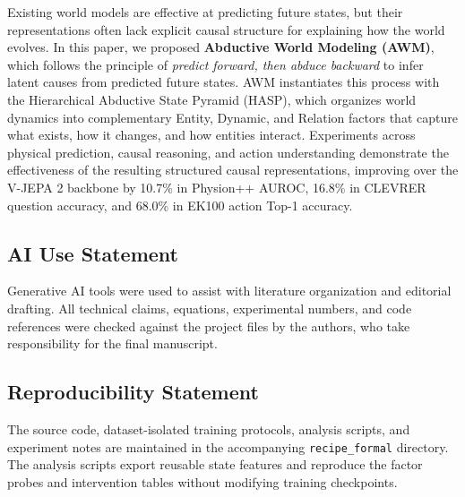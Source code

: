 \documentclass{article}
\begin{document}
Existing world models are effective at predicting future states, but their representations often lack explicit causal structure for explaining how the world evolves. In this paper, we proposed \textbf{Abductive World Modeling (AWM)}, which follows the principle of \emph{predict forward, then abduce backward} to infer latent causes from predicted future states. AWM instantiates this process with the Hierarchical Abductive State Pyramid (HASP), which organizes world dynamics into complementary Entity, Dynamic, and Relation factors that capture what exists, how it changes, and how entities interact. Experiments across physical prediction, causal reasoning, and action understanding demonstrate the effectiveness of the resulting structured causal representations, improving over the V-JEPA 2 backbone by 10.7\% in Physion++ AUROC, 16.8\% in CLEVRER question accuracy, and 68.0\% in EK100 action Top-1 accuracy.


\subsection*{AI Use Statement}
Generative AI tools were used to assist with literature organization and editorial drafting.  All technical claims, equations, experimental numbers, and code references were checked against the project files by the authors, who take responsibility for the final manuscript.

\subsection*{Reproducibility Statement}
The source code, dataset-isolated training protocols, analysis scripts, and experiment notes are maintained in the accompanying \texttt{recipe\_formal} directory.  The analysis scripts export reusable state features and reproduce the factor probes and intervention tables without modifying training checkpoints.




\appendix


\end{document}
